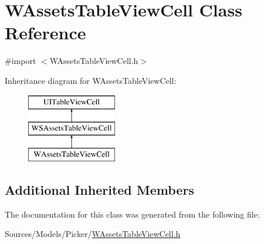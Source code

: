 \hypertarget{interface_w_assets_table_view_cell}{\section{W\-Assets\-Table\-View\-Cell Class Reference}
\label{interface_w_assets_table_view_cell}
}


{\ttfamily \#import $<$W\-Assets\-Table\-View\-Cell.\-h$>$}

Inheritance diagram for W\-Assets\-Table\-View\-Cell\-:\begin{figure}[H]
\begin{center}
\leavevmode
\includegraphics[height=3.000000cm]{interface_w_assets_table_view_cell}
\end{center}
\end{figure}
\subsection*{Additional Inherited Members}


The documentation for this class was generated from the following file\-:\begin{DoxyCompactItemize}
\item 
Sources/\-Models/\-Picker/\hyperlink{_w_assets_table_view_cell_8h}{W\-Assets\-Table\-View\-Cell.\-h}\end{DoxyCompactItemize}
